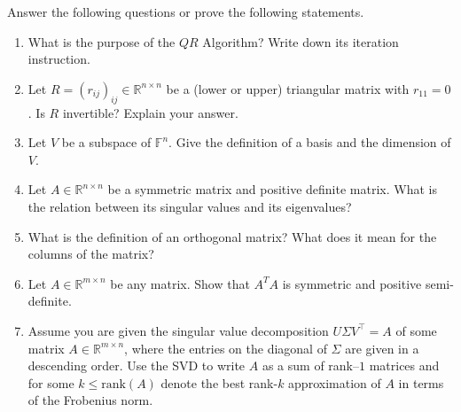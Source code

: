 Answer the following questions or prove the following statements.
\begin{enumerate}
	\item What is the purpose of the $QR$ Algorithm? Write down its iteration instruction.
	\item Let $R=(r_{ij})_{ij} \in \mathbb{R}^{n \times n}$ be a (lower or upper) triangular matrix with $r_{11} = 0$. Is $R$ invertible? Explain your answer.	
	\item Let $V$ be a subspace  of $\mathbb{F}^n$. Give the definition of a basis and the dimension of $V$.		
	\item Let $A \in \mathbb{R}^{n \times n}$ be a symmetric matrix and positive definite matrix. What is the relation between its singular values and its eigenvalues?
	\item What is the definition of an orthogonal matrix? What does it mean for the columns of the matrix?
	\item Let $A \in  \mathbb{R}^{m \times n}$ be any matrix. Show that $A^TA$ is symmetric and positive semi-definite.
	\item Assume you are given the singular value decomposition 
$U \Sigma V^\top = A$ of some matrix $A \in \mathbb{R}^{m \times n}$, where the 
entries on the diagonal of $\Sigma$ are given in a descending order. Use the SVD to write $A$ as a sum of rank--$1$ matrices and for some $k \leq \text{rank}(A)$ denote the best rank-$k$ approximation of $A$ in terms of the Frobenius norm.
\end{enumerate}